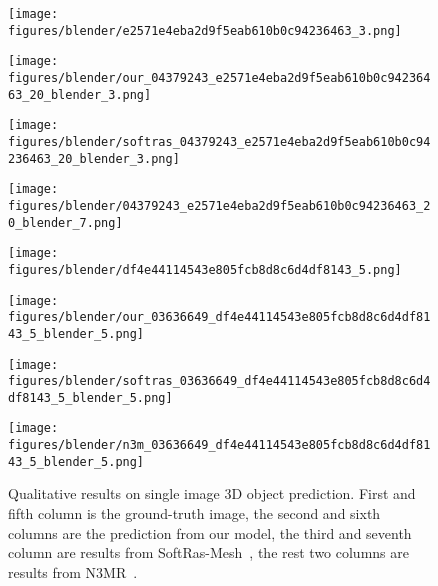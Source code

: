 \documentclass{article}
\begin{document}
\begin{minipage}[t] {0.09\textwidth}
\begin{figure}
\begin{minipage}[t] {0.115\textwidth}
    \centering
    \texttt{[image: figures/blender/e2571e4eba2d9f5eab610b0c94236463\_3.png]}
    \end{minipage}
    \begin{minipage}[t] {0.115\textwidth}
    \centering
    \texttt{[image: figures/blender/our\_04379243\_e2571e4eba2d9f5eab610b0c94236463\_20\_blender\_3.png]}
    \end{minipage}
    \begin{minipage}[t] {0.115\textwidth}
    \centering
    \texttt{[image: figures/blender/softras\_04379243\_e2571e4eba2d9f5eab610b0c94236463\_20\_blender\_3.png]}
    \end{minipage}
    \begin{minipage}[t] {0.115\textwidth}
    \centering
    \texttt{[image: figures/blender/04379243\_e2571e4eba2d9f5eab610b0c94236463\_20\_blender\_7.png]}
    \end{minipage}
    \begin{minipage}[t] {0.115\textwidth}
    \centering
    \texttt{[image: figures/blender/df4e44114543e805fcb8d8c6d4df8143\_5.png]}
    \end{minipage}
    \begin{minipage}[t] {0.115\textwidth}
    \centering
    \texttt{[image: figures/blender/our\_03636649\_df4e44114543e805fcb8d8c6d4df8143\_5\_blender\_5.png]}
    \end{minipage}
    \begin{minipage}[t] {0.115\textwidth}
    \centering
    \texttt{[image: figures/blender/softras\_03636649\_df4e44114543e805fcb8d8c6d4df8143\_5\_blender\_5.png]}
    \end{minipage}
    \begin{minipage}[t] {0.115\textwidth}
    \centering
    \texttt{[image: figures/blender/n3m\_03636649\_df4e44114543e805fcb8d8c6d4df8143\_5\_blender\_5.png]}
    \end{minipage}
    \vspace{-15pt}
    \caption{\footnotesize Qualitative results on single image 3D object prediction. First and fifth column is the ground-truth image, the second and sixth columns are the prediction from our model, the third and seventh column are results from SoftRas-Mesh~\cite{liu2019soft}, the rest two columns are results from N3MR~\cite{NMR}.} 
    \vspace{-0.0em}
    \label{fig:3d-reconstruction}
\end{figure}


\end{minipage}
\end{document}
